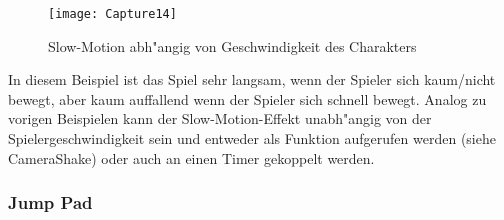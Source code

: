 \documentclass[11pt, titlepage]{article}
\begin{document}
\newpage

\begin{figure}[h]
\texttt{[image: Capture14]}
\caption{Slow-Motion abh"angig von Geschwindigkeit des Charakters}
\end{figure}

\noindent In diesem Beispiel ist das Spiel sehr langsam, wenn der Spieler sich kaum/nicht bewegt, aber kaum auffallend wenn der Spieler sich schnell bewegt. Analog zu vorigen Beispielen kann der Slow-Motion-Effekt unabh"angig von der Spielergeschwindigkeit sein und entweder als Funktion aufgerufen werden (siehe CameraShake) oder auch an einen Timer gekoppelt werden.

\subsubsection{Jump Pad}
\end{document}
